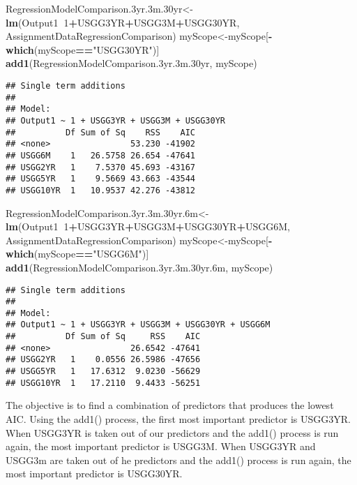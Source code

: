 \documentclass[]{article}
\newenvironment{Shaded}{\begin{snugshade}}{\end{snugshade}}
\newcommand{\KeywordTok}[1]{\textcolor[rgb]{0.13,0.29,0.53}{\textbf{#1}}}
\newcommand{\DecValTok}[1]{\textcolor[rgb]{0.00,0.00,0.81}{#1}}
\newcommand{\StringTok}[1]{\textcolor[rgb]{0.31,0.60,0.02}{#1}}
\newcommand{\OperatorTok}[1]{\textcolor[rgb]{0.81,0.36,0.00}{\textbf{#1}}}
\newcommand{\NormalTok}[1]{#1}
\begin{document}
\begin{Shaded}
\begin{Highlighting}[]
\NormalTok{RegressionModelComparison.3yr.3m.30yr<-}\KeywordTok{lm}\NormalTok{(Output1}\OperatorTok{~}\DecValTok{1}\OperatorTok{+}\NormalTok{USGG3YR}\OperatorTok{+}\NormalTok{USGG3M}\OperatorTok{+}\NormalTok{USGG30YR, AssignmentDataRegressionComparison)}
\NormalTok{myScope<-myScope[}\OperatorTok{-}\KeywordTok{which}\NormalTok{(myScope}\OperatorTok{==}\StringTok{"USGG30YR"}\NormalTok{)]}
\KeywordTok{add1}\NormalTok{(RegressionModelComparison.3yr.3m.30yr, myScope)}
\end{Highlighting}
\end{Shaded}

\begin{verbatim}
## Single term additions
## 
## Model:
## Output1 ~ 1 + USGG3YR + USGG3M + USGG30YR
##          Df Sum of Sq    RSS    AIC
## <none>                53.230 -41902
## USGG6M    1   26.5758 26.654 -47641
## USGG2YR   1    7.5370 45.693 -43167
## USGG5YR   1    9.5669 43.663 -43544
## USGG10YR  1   10.9537 42.276 -43812
\end{verbatim}

\begin{Shaded}
\begin{Highlighting}[]
\NormalTok{RegressionModelComparison.3yr.3m.30yr.6m<-}\KeywordTok{lm}\NormalTok{(Output1}\OperatorTok{~}\DecValTok{1}\OperatorTok{+}\NormalTok{USGG3YR}\OperatorTok{+}\NormalTok{USGG3M}\OperatorTok{+}\NormalTok{USGG30YR}\OperatorTok{+}\NormalTok{USGG6M, AssignmentDataRegressionComparison)}
\NormalTok{myScope<-myScope[}\OperatorTok{-}\KeywordTok{which}\NormalTok{(myScope}\OperatorTok{==}\StringTok{"USGG6M"}\NormalTok{)]}
\KeywordTok{add1}\NormalTok{(RegressionModelComparison.3yr.3m.30yr.6m, myScope)}
\end{Highlighting}
\end{Shaded}

\begin{verbatim}
## Single term additions
## 
## Model:
## Output1 ~ 1 + USGG3YR + USGG3M + USGG30YR + USGG6M
##          Df Sum of Sq     RSS    AIC
## <none>                26.6542 -47641
## USGG2YR   1    0.0556 26.5986 -47656
## USGG5YR   1   17.6312  9.0230 -56629
## USGG10YR  1   17.2110  9.4433 -56251
\end{verbatim}

The objective is to find a combination of predictors that produces the
lowest AIC. Using the add1() process, the first most important predictor
is USGG3YR. When USGG3YR is taken out of our predictors and the add1()
process is run again, the most important predictor is USGG3M. When
USGG3YR and USGG3m are taken out of he predictors and the add1() process
is run again, the most important predictor is USGG30YR.
\end{document}
